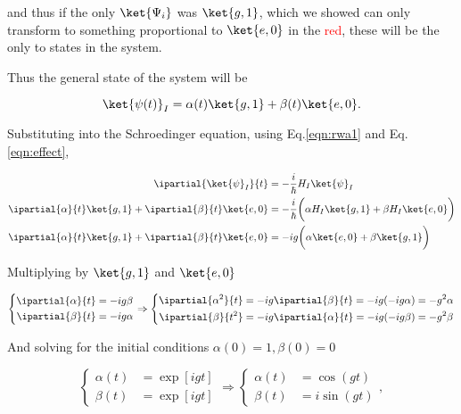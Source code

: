 \noindent and thus if the only $\ket{\Psi_i}$ was $\ket{g,1}$, which we showed can only transform to something proportional to $\ket{e,0}$ in the \textcolor{red}{red}, these will be the only to states in the system.

Thus the general state of the system will be

\begin{equation}
\label{eqn:resonance_GeneralEquation}
\ket{\psi(t)}_I = \alpha(t)\ket{g,1} + \beta(t)\ket{e,0}.
\end{equation}

\noindent Substituting into the Schroedinger equation, using Eq.\eqref{eqn:rwa1} and Eq.\eqref{eqn:effect},

\begin{equation}
\begin{aligned}
\ipartial{\ket{\psi}_I}{t} & = -\frac{i}{\hbar}H_I\ket{\psi}_I\\
\ipartial{\alpha}{t}\ket{g,1} + \ipartial{\beta}{t}\ket{e,0} & = -\frac{i}{\hbar} \bigg(\alpha H_I\ket{g,1} + \beta H_I\ket{e,0} \bigg)\\
\ipartial{\alpha}{t}\ket{g,1} + \ipartial{\beta}{t}\ket{e,0} & = -ig\bigg(\alpha\ket{e,0} + \beta\ket{g,1} \bigg)\\
\end{aligned}
\end{equation}

\noindent Multiplying by $\ket{g,1}$ and $\ket{e,0}$

\begin{equation}
\left\lbrace
\begin{aligned}
\ipartial{\alpha}{t} & = -ig\beta\\
\ipartial{\beta}{t} & = -ig\alpha\\
\end{aligned}\right.
\Rightarrow \left\lbrace
\begin{aligned}
\ipartial{\alpha^2}{t} & = -ig\ipartial{\beta}{t} = -ig(-ig\alpha)=-g^2\alpha\\
\ipartial{\beta}{t^2} & = -ig\ipartial{\alpha}{t} = -ig(-ig\beta)=-g^2\beta\\
\end{aligned}\right.
\end{equation}

\noindent And solving for the initial conditions $\alpha(0) = 1, \beta(0) = 0$

\begin{equation}
\left\lbrace
\begin{aligned}
\alpha(t) & = \exp[igt]\\
\beta(t) & = \exp[igt]
\end{aligned}\right.
\Rightarrow
\left\lbrace
\begin{aligned}
\alpha(t) & = \cos(gt)\\
\beta(t) & = i\sin(gt)
\end{aligned}\right.,
\end{equation}

